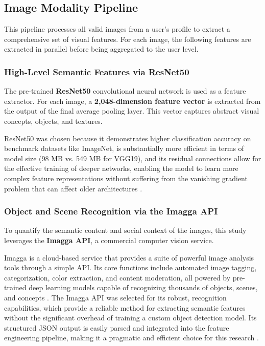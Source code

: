 \subsection{Image Modality Pipeline}
This pipeline processes all valid images from a user's profile to extract a comprehensive set of visual features. For each image, the following features are extracted in parallel before being aggregated to the user level.

\subsubsection{High-Level Semantic Features via ResNet50}
The pre-trained \textbf{ResNet50} convolutional neural network is used as a feature extractor. For each image, a \textbf{2,048-dimension feature vector} is extracted from the output of the final average pooling layer. This vector captures abstract visual concepts, objects, and textures.

ResNet50 was chosen because it demonstrates higher classification accuracy on benchmark datasets like ImageNet, is substantially more efficient in terms of model size (98 MB vs. 549 MB for VGG19), and its residual connections allow for the effective training of deeper networks, enabling the model to learn more complex feature representations without suffering from the vanishing gradient problem that can affect older architectures \citep{he2015, simonyan2014very}.

\subsubsection{Object and Scene Recognition via the Imagga API}
To quantify the semantic content and social context of the images, this study leverages the \textbf{Imagga API}, a commercial computer vision service.

Imagga is a cloud-based service that provides a suite of powerful image analysis tools through a simple API. Its core functions include automated image tagging, categorization, color extraction, and content moderation, all powered by pre-trained deep learning models capable of recognizing thousands of objects, scenes, and concepts \citep{imagga_website, imagga_solutions}. The Imagga API was selected for its robust, recognition capabilities, which provide a reliable method for extracting semantic features without the significant overhead of training a custom object detection model. Its structured JSON output is easily parsed and integrated into the feature engineering pipeline, making it a pragmatic and efficient choice for this research \citep{imagga_docs}.

